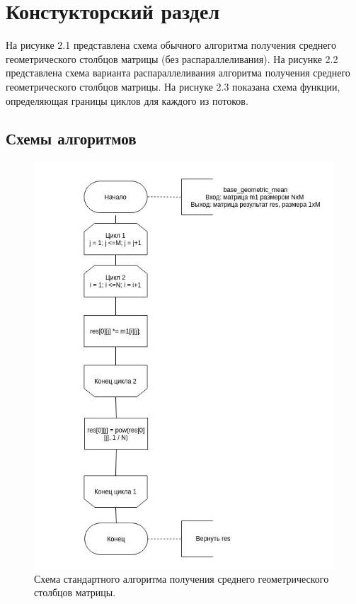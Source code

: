 \chapter{ Констукторский раздел}
\label{cha:design}
    На рисунке 2.1 представлена схема обычного алгоритма получения среднего геометрического столбцов матрицы (без распараллеливания). На рисунке 2.2 представлена схема варианта распараллеливания алгоритма получения среднего геометрического столбцов матрицы. На риснуке 2.3 показана схема функции, определяющая границы циклов для каждого из потоков.

    \section{Схемы алгоритмов}
    
    
    \begin{figure}[h]
    	\centering
    	\includegraphics[scale=0.93]{base.jpg}
    	\caption{Схема стандартного алгоритма получения среднего геометрического столбцов матрицы.}
    	\label{fig:mpr}
    \end{figure}
    
